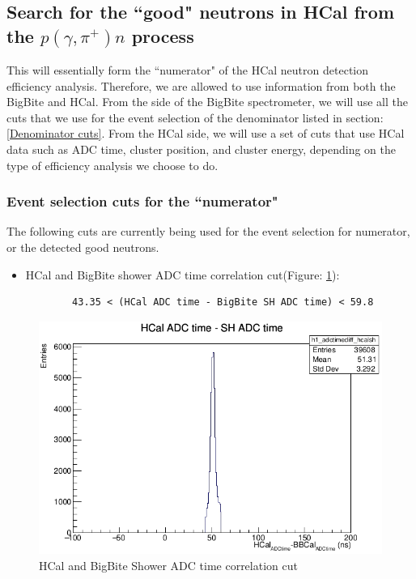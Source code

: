 \subsection{Search for the ``good" neutrons in HCal from the $p(\gamma,\pi^+)n$ process}
This will essentially form the ``numerator" of the HCal neutron detection efficiency analysis. Therefore, we are allowed to use information from both the BigBite and HCal. From the side of the BigBite spectrometer, we will use all the cuts that we use for the event selection of the denominator listed in section: \ref{Denominator cuts}. From the HCal side, we will use a set of cuts that use HCal data such as ADC time, cluster position, and cluster energy, depending on the type of efficiency analysis we choose to do.

\subsubsection{Event selection cuts for the ``numerator"}\label{Numerator cuts}
The following cuts are currently being used for the event selection for numerator, or the detected good neutrons.
\begin{itemize}    
    \item HCal and BigBite shower ADC time correlation cut(Figure: \ref{fig: HCal SH ADC time corr}):
    \begin{verbatim}
        43.35 < (HCal ADC time - BigBite SH ADC time) < 59.8
    \end{verbatim}      
\end{itemize}

\begin{figure}[h!]
    \centering
    \includegraphics[scale=0.75]{Images/sbs9_hydrogen_analysis/HCalADCtime_min_SHADCtime.png}
    \caption{HCal and BigBite Shower ADC time correlation cut}
    \label{fig: HCal SH ADC time corr}
\end{figure}

